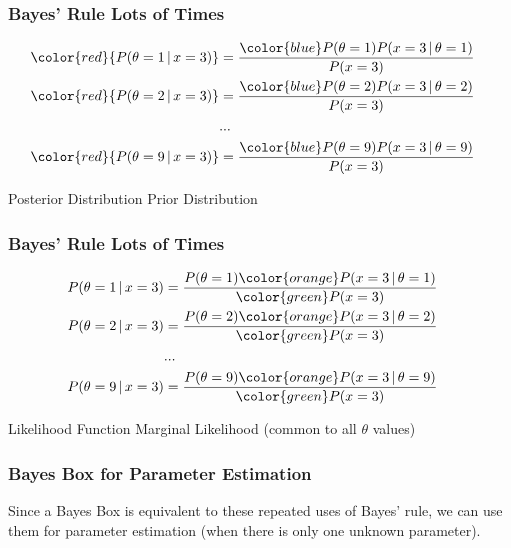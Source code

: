 \documentclass{beamer}
\newcommand{\given}{\,|\,}
\begin{document}
\begin{frame}
\frametitle{Bayes' Rule Lots of Times}
\begin{align}
\color{red}{P(\theta = 1 \given x = 3)} &= \frac{{\color{blue}P(\theta=1)}P(x=3 \given \theta=1)}{P(x=3)}\\
\color{red}{P(\theta = 2 \given x = 3)} &= \frac{{\color{blue}P(\theta=2)}P(x=3 \given \theta=2)}{P(x=3)}\\
&...&\\
\color{red}{P(\theta = 9 \given x = 3)} &= \frac{{\color{blue}P(\theta=9)}P(x=3 \given \theta=9)}{P(x=3)}\\
\end{align}

{\color{red}Posterior Distribution}
{\color{blue}Prior Distribution}

\end{frame}


\begin{frame}
\frametitle{Bayes' Rule Lots of Times}
\begin{align}
P(\theta = 1 \given x = 3) &= \frac{P(\theta=1){\color{orange}P(x=3 \given \theta=1)}}{\color{green}P(x=3)}\\
P(\theta = 2 \given x = 3) &= \frac{P(\theta=2){\color{orange}P(x=3 \given \theta=2)}}{\color{green}P(x=3)}\\
&...&\\
P(\theta = 9 \given x = 3) &= \frac{P(\theta=9){\color{orange}P(x=3 \given \theta=9)}}{\color{green}P(x=3)}\\
\end{align}

{\color{orange}Likelihood Function}
{\color{green}Marginal Likelihood (common to all $\theta$ values)}

\end{frame}

\begin{frame}
\frametitle{Bayes Box for Parameter Estimation}
Since a Bayes Box is equivalent to these repeated uses of Bayes' rule,
we can use them for parameter estimation (when there is only one unknown
parameter).

\end{frame}
\end{document}
